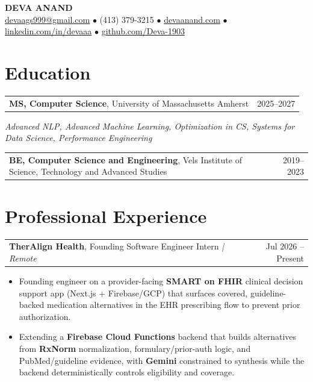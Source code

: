 \documentclass[letterpaper,11pt]{article}
\makeatletter
\newcommand{\eduItem}[3]{%
  \begin{tabular*}{\textwidth}{@{}l@{\extracolsep{\fill}}r@{}}
    \textbf{#1}, #2 & #3 \\
  \end{tabular*}\par
}
\newcommand{\expItem}[4]{%
  \vspace{2pt}
  \begin{tabular*}{\textwidth}{@{}l@{\extracolsep{\fill}}r@{}}
    \textbf{#1}, #2 \textit{| #3} & #4 \\
  \end{tabular*}\par\vspace{-3pt}
}
\makeatother
\begin{document}
\begin{center}
    {\fontsize{18}{20}\selectfont\bfseries DEVA ANAND}\\ \vspace{3pt}
    {\small
    \href{mailto:devaags999@gmail.com}{devaags999@gmail.com}
    \enspace$\bullet$\enspace
    (413) 379-3215
    \enspace$\bullet$\enspace
    \href{https://devaanand.com}{devaanand.com}
    \enspace$\bullet$\enspace
    \href{https://linkedin.com/in/devaaa/}{linkedin.com/in/devaaa}
    \enspace$\bullet$\enspace
    \href{https://github.com/Deva-1903}{github.com/Deva-1903}}
\end{center}
\vspace{-8pt}

\section{Education}
\eduItem{MS, Computer Science}{University of Massachusetts Amherst}{2025--2027}
{\small\textit{Advanced NLP, Advanced Machine Learning, Optimization in CS, Systems for Data Science, Performance Engineering}}\par
\vspace{3pt}
\eduItem{BE, Computer Science and Engineering}{Vels Institute of Science, Technology and Advanced Studies}{2019--2023}

\section{Professional Experience}

\expItem{TherAlign Health}{Founding Software Engineer Intern}{Remote}{Jul 2026 -- Present}
\begin{itemize}
  \item Founding engineer on a provider-facing \textbf{SMART on FHIR} clinical decision support app (Next.js + Firebase/GCP) that surfaces covered, guideline-backed medication alternatives in the EHR prescribing flow to prevent prior authorization.
  \item Extending a \textbf{Firebase Cloud Functions} backend that builds alternatives from \textbf{RxNorm} normalization, formulary/prior-auth logic, and PubMed/guideline evidence, with \textbf{Gemini} constrained to synthesis while the backend deterministically controls eligibility and coverage.
\end{itemize}
\end{document}
